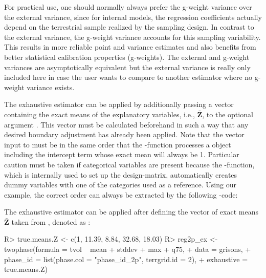 For practical use, one should normally always prefer the g-weight variance over the external variance, since for internal models, the regression coefficients actually depend on the terrestrial sample realized by the sampling design. In contrast to the external variance, the g-weight variance accounts for this sampling variability. This results in more reliable point and variance estimates and also benefits from better statistical calibration properties (g-weights). The external and g-weight variances are asymptotically equivalent but the external variance is really only included here in case the user wants to compare to another estimator where no g-weight variance exists.

The exhaustive estimator can be applied by additionally passing a vector containing the exact means of the explanatory variables, i.e., $\bar{\pmb{Z}}$, to the optional argument . This vector must be calculated beforehand in such a way that any desired boundary adjustment has already been applied. Note that the vector input to  must be in the same order that the -function processes a  object including the intercept term whose exact mean will always be 1. Particular caution must be taken if categorical variables are present because the -function, which is internally used to set up the design-matrix, automatically creates dummy variables with one of the categories used as a reference. Using our  example, the correct order can always be extracted by the following -code:


\begin{small}
\begin{Schunk}
\end{Schunk}
\end{small}

The exhaustive estimator can be applied after defining the vector of exact means $\bar{}$ taken from \citet{mandallaz2013b}, denoted as :

\begin{small}
\begin{Schunk}
\begin{Sinput}
R> true.means.Z <- c(1, 11.39, 8.84, 32.68, 18.03)
R> reg2p_ex <- twophase(formula = tvol ~ mean + stddev + max + q75,
+    data = grisons,
+    phase_id = list(phase.col = "phase_id_2p", terrgrid.id = 2),
+    exhaustive = true.means.Z)
\end{Sinput}
\end{Schunk}
\end{small}

